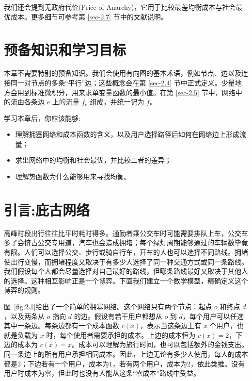 我们还会提到无政府代价(Price of Anarchy)，它用于比较最差均衡成本与社会最优成本。更多细节可参考第 \ref{sec-2.7} 节中的文献说明。

\section{预备知识和学习目标}

本章不需要特别的预备知识。我们会使用有向图的基本术语，例如节点、边以及连接同一对节点的多条“平行”边；这些概念会在第 \ref{sec-2.4} 节中正式定义。少量地方会用到标准微积分，用来求单变量函数的最小值。在第 \ref{sec-2.5} 节中，网络中的流由各条边 \(e\) 上的流量 \({f}_{e}\) 组成，并统一记为 \(f\)。

学习本章后，你应该能够:
\begin{itemize}
\item 理解拥塞网络和成本函数的含义，以及用户选择路径后如何在网络边上形成流量；
\item 求出网络中的均衡和社会最优，并比较二者的差异；
\item 理解势函数为什么能够用来寻找均衡。
\end{itemize}

\section{引言:庇古网络}\label{sec-2.2}

高峰时段出行往往比平时耗时得多。通勤者乘公交车时可能需要排队上车，公交车多了会挤占公交专用道，汽车也会造成拥堵；每个绿灯周期能够通过的车辆数毕竟有限。人们可以选择公交、步行或骑自行车，开车的人也可以选择不同路线。拥堵使出行变慢，而拥堵程度又取决于有多少人选择了同一种交通方式或同一条路线。我们假设每个人都会尽量选择对自己最好的路线，但哪条路线最好又取决于其他人的选择。这种相互影响正是一个博弈。下面我们建立一个数学模型，精确定义这个博弈的规则。

图~\ref{fig:2.1}给出了一个简单的拥塞网络。这个网络只有两个节点：起点 \(o\) 和终点 \(d\)，以及两条从 \(o\) 指向 \(d\) 的边。假设有若干用户都想从 \(o\) 到 \(d\)，每个用户可以任选其中一条边。每条边都有一个成本函数 \(c\left( x\right)\)，表示当这条边上有 \(x\) 个用户，也就是负载为 \(x\) 时，每个使用者需要承担的成本。上边的成本恒为 \(c\left( x\right)  = 2\)，下边的成本为 \(c\left( x\right)  = x\)。成本可以理解为旅行时间，也可以包括额外的金钱支出。同一条边上的所有用户承担相同成本。因此，上边无论有多少人使用，每人的成本都是2；下边若有一个用户，成本为1，若有两个用户，成本为2，依此类推。没有用户时成本为零，但此时也没有人能从这条“零成本”路线中受益。

